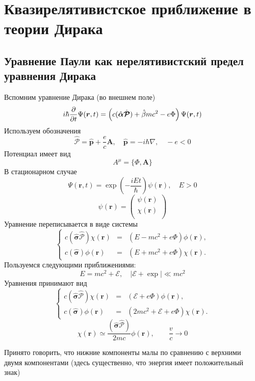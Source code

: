 \section{Квазирелятивистское приближение в теории Дирака}

\subsection{Уравнение Паули как нерелятивистский предел уравнения Дирака}

\def \bf {\boldsymbol}

Вспомним уравнение Дирака (во внешнем поле)
$$
    i \hbar \ud{}{t} \Psi(\bf r, t) = \left(
        c (\hat{\bf \alpha} \hat{\bf{\mathcal P}}) + \hat\beta mc^2 - e \Phi
    \right) \Psi(\bf r, t)
$$
Используем обозначения
$$
    \hat{\bf{\mathcal P}} = \hat{\bf p} + \dfrac{e}{c} \bf A, \quad \hat{\bf p} = - i \hbar \nabla, \quad -e < 0
$$
Потенциал имеет вид
$$
    A^{\mu} = \{\Phi, \bf A\}
$$
В стационарном случае
$$
    \Psi(\bf r, t) = \exp \left(
        -\dfrac{iEt}{\hbar}
    \right) \psi(\bf r), \quad E > 0
$$
$$
    \psi(\bf r) = \begin{pmatrix}
                    \psi(\bf r) \\
                    \chi(\bf r) \\
                  \end{pmatrix}
$$
Уравнение переписывается в виде системы
$$
    \left\{
      \begin{array}{lcl}
        c (\hat{\bf \sigma} \hat{\bf{\mathcal P}}) \chi(\bf r) & = & (E - mc^2 + e \Phi) \phi(\bf r) ,\\
        c (\hat {\bf \sigma}) \phi(\bf r) & = & (E + mc^2 + e \Phi) \chi(\bf r).
      \end{array}
    \right.
$$
Пользуемся следующими приближениями:
$$
    E = mc^2 + \mathcal E, \quad |\mathcal E + \exp| \ll mc^2
$$
Уравнения принимают вид
$$
    \left\{
      \begin{array}{lcl}
        c (\hat{\bf \sigma} \hat{\bf{\mathcal P}}) \chi(\bf r) & = & (\mathcal E + e \Phi) \phi(\bf r) ,\\
        c (\hat {\bf \sigma}) \phi(\bf r) & = & (2mc^2 + \mathcal E + e \Phi) \chi(\bf r).
      \end{array}
    \right.
$$
$$
    \boxed{
        \chi(\bf r) \simeq \dfrac{(\hat{\bf \sigma} \hat{\bf{\mathcal P}})}{2mc} \phi(\bf r)
    }, \qquad \dfrac{v}{c} \to 0
$$

Принято говорить, что нижние компоненты малы по сравнению с верхними двумя компонентами (здесь существенно, что энергия имеет положительный знак) 


